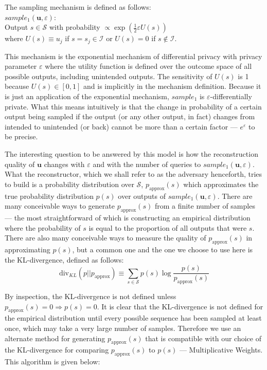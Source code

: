 \documentclass[preprint2]{aastex}
\begin{document}
The sampling mechanism is defined as follows: \\

\noindent\(sample_1(\mathbf{u}, \varepsilon):\) \\
\indent Output \(s \in \mathcal{S}\) with probability \(\propto \exp \left( \frac{1}{2} \varepsilon U(s) \right)\) \\

\noindent where \(U(s) \equiv u_j\) if \(s = s_j \in \mathcal{I}\) or \(U(s) = 0\) if \(s \notin \mathcal{I}\).

This mechanism is the exponential mechanism of differential privacy with privacy parameter \(\varepsilon\) where the utility function is defined over the outcome space of all possible outputs, including unintended outputs. The sensitivity of \(U(s)\) is 1 because \(U(s) \in [0, 1]\) and is implicitly in the mechanism definition. Because it is just an application of the exponential mechanism, \(sample_1\) is \(\varepsilon\)-differentially private. What this means intuitively is that the change in probability of a certain output being sampled if the output (or any other output, in fact) changes from intended to unintended (or back) cannot be more than a certain factor --- \(e^\varepsilon\) to be precise.

The interesting question to be answered by this model is how the reconstruction quality of \(\mathbf{u}\) changes with \(\varepsilon\) and with the number of queries to \(sample_1(\mathbf{u}, \varepsilon)\). What the reconstructor, which we shall refer to as the adversary henceforth, tries to build is a probability distribution over \(\mathcal{S}\), \(p_\text{approx}(s)\) which approximates the true probability distribution \(p(s)\) over outputs of \(sample_1(\mathbf{u}, \varepsilon)\). There are many conceivable ways to generate \(p_\text{approx}(s)\) from a finite number of samples --- the most straightforward of which is constructing an empirical distribution where the probability of \(s\) is equal to the proportion of all outputs that were \(s\). There are also many conceivable ways to measure the quality of \(p_\text{approx}(s)\) in approximating \(p(s)\), but a common one and the one we choose to use here is the KL-divergence, defined as follows:
\[
\text{div}_{KL}(p||p_\text{approx}) \equiv \sum_{s \in \mathcal{S}} p(s) \log \frac{p(s)}{p_\text{approx}(s)}
\]

By inspection, the KL-divergence is not defined unless \(p_\text{approx}(s) = 0 \Rightarrow p(s) = 0\). It is clear that the KL-divergence is not defined for the empirical distribution until every possible sequence has been sampled at least once, which may take a very large number of samples. Therefore we use an alternate method for generating \(p_\text{approx}(s)\) that is compatible with our choice of the KL-divergence for comparing \(p_\text{approx}(s)\) to \(p(s)\) --- Multiplicative Weights. This algorithm is given below: \\
\end{document}
